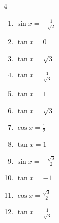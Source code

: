\begin{multicols}{4}
\begin{enumerate}
  \item $\displaystyle \sin{x}  = -\frac{1}{\sqrt{2}}$


  \item $\displaystyle \tan{x}  = 0$


  \item $\displaystyle \tan{x}  = \sqrt{3}$


  \item $\displaystyle \tan{x}  = \frac{1}{\sqrt{3}}$


  \item $\displaystyle \tan{x}  = 1$


  \item $\displaystyle \tan{x}  = \sqrt{3}$


  \item $\displaystyle \cos{x}  = \frac{1}{2}$


  \item $\displaystyle \tan{x}  = 1$


  \item $\displaystyle \sin{x}  = -\frac{\sqrt{3}}{2}$


  \item $\displaystyle \tan{x}  = -1$


  \item $\displaystyle \cos{x}  = \frac{\sqrt{3}}{2}$


  \item $\displaystyle \tan{x}  = \frac{1}{\sqrt{3}}$


\end{enumerate}
\end{multicols}

